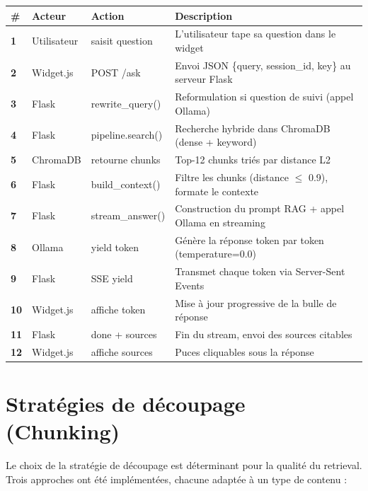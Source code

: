 \documentclass[12pt,a4paper]{report}
\begin{document}
\begin{center}
\renewcommand{\arraystretch}{1.4}
\begin{tabularx}{\linewidth}{>{\small\bfseries}p{0.4cm} p{2.2cm} >{\small\ttfamily}p{3.5cm} X}
  \toprule
  \rowcolor{rowblue}
  \textbf{\#} & \textbf{Acteur} & \textbf{Action} & \textbf{Description} \\
  \midrule
  1 & Utilisateur      & saisit question     & L'utilisateur tape sa question dans le widget \\
  2 & Widget.js        & POST /ask           & Envoi JSON \{query, session\_id, key\} au serveur Flask \\
  3 & Flask            & rewrite\_query()    & Reformulation si question de suivi (appel Ollama) \\
  4 & Flask            & pipeline.search()   & Recherche hybride dans ChromaDB (dense + keyword) \\
  5 & ChromaDB         & retourne chunks     & Top-12 chunks triés par distance L2 \\
  6 & Flask            & build\_context()    & Filtre les chunks (distance $\leq$ 0.9), formate le contexte \\
  7 & Flask            & stream\_answer()    & Construction du prompt RAG + appel Ollama en streaming \\
  8 & Ollama           & yield token         & Génère la réponse token par token (temperature=0.0) \\
  9 & Flask            & SSE yield           & Transmet chaque token via Server-Sent Events \\
  10 & Widget.js       & affiche token       & Mise à jour progressive de la bulle de réponse \\
  11 & Flask           & done + sources      & Fin du stream, envoi des sources citables \\
  12 & Widget.js       & affiche sources     & Puces cliquables sous la réponse \\
  \bottomrule
\end{tabularx}
\end{center}

\section{Strat\'{e}gies de d\'{e}coupage (Chunking)}

Le choix de la strat\'{e}gie de d\'{e}coupage est d\'{e}terminant pour la qualit\'{e} du retrieval.
Trois approches ont \'{e}t\'{e} impl\'{e}ment\'{e}es, chacune adapt\'{e}e \`{a} un type de contenu :
\end{document}
